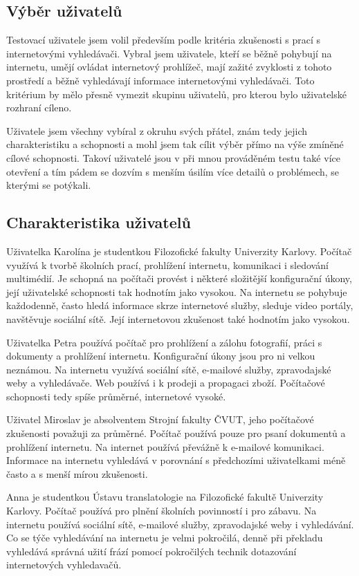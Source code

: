 \subsection{Výběr uživatelů}
Testovací uživatele jsem volil především podle kritéria zkušenosti s prací s internetovými vyhledávači. Vybral jsem uživatele, kteří se běžně pohybují na internetu, umějí ovládat internetový prohlížeč, mají zažité zvyklosti z tohoto prostředí a běžně vyhledávají informace internetovými vyhledávači. Toto kritérium by mělo přesně vymezit skupinu uživatelů, pro kterou bylo uživatelské rozhraní cíleno.

Uživatele jsem všechny vybíral z okruhu svých přátel, znám tedy jejich charakteristiku a schopnosti a mohl jsem tak cílit výběr přímo na výše zmíněné cílové schopnosti. Takoví uživatelé jsou v při mnou prováděném testu také více otevření a tím pádem se dozvím s menším úsilím více detailů o problémech, se kterými se potýkali.

\subsection{Charakteristika uživatelů}
Uživatelka Karolína je studentkou Filozofické fakulty Univerzity Karlovy. Počítač využívá k tvorbě školních prací, prohlížení internetu, komunikaci i sledování multimédií. Je schopná na počítači provést i některé složitější konfigurační úkony, její uživatelské schopnosti tak hodnotím jako vysokou. Na internetu se pohybuje každodenně, často hledá informace skrze internetové služby, sleduje video portály, navštěvuje sociální sítě. Její internetovou zkušenost také hodnotím jako vysokou.

Uživatelka Petra používá počítač pro prohlížení a zálohu fotografií, práci s dokumenty a prohlížení internetu. Konfigurační úkony jsou pro ni velkou neznámou. Na internetu využívá sociální sítě, e-mailové služby, zpravodajské weby a vyhledávače. Web používá i k prodeji a propagaci zboží. Počítačové schopnosti tedy spíše průměrné, internetové vysoké.

Uživatel Miroslav je absolventem Strojní fakulty ČVUT, jeho počítačové zkušenosti považuji za průměrné. Počítač používá pouze pro psaní dokumentů a prohlížení internetu. Na internet používá převážně k e-mailové komunikaci. Informace na internetu vyhledává v porovnání s předchozími uživatelkami méně často a s menší mírou zkušenosti.

Anna je studentkou Ústavu translatologie na Filozofické fakultě Univerzity Karlovy. Počítač používá pro plnění školních povinností i pro zábavu. Na internetu používá sociální sítě, e-mailové služby, zpravodajské weby i vyhledávání. Co se týče vyhledávání na internetu je velmi pokročilá, denně při překladu vyhledává správná užití frází pomocí pokročilých technik dotazování internetových vyhledavačů.

